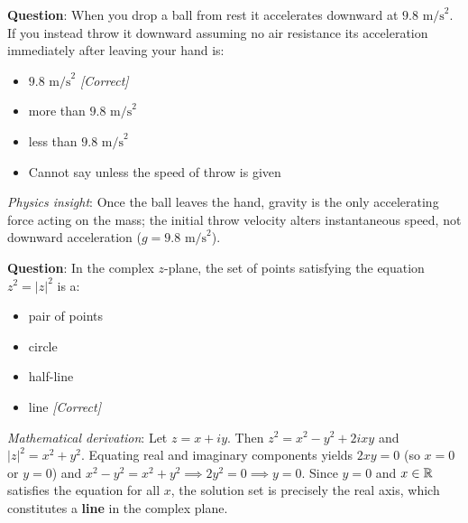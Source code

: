 \documentclass[../../../main.tex]{subfiles}
\begin{document}
\begin{center}
\begin{minipage}{0.95\textwidth}
\begin{tcolorbox}[colback=cardBg,colframe=cardLine,arc=2pt,boxrule=0.5pt,title=\textbf{MMLU Example 1: Conceptual Physics}]
\small\sffamily
\textbf{Question}: When you drop a ball from rest it accelerates downward at $9.8\text{ m/s}^2$. If you instead throw it downward assuming no air resistance its acceleration immediately after leaving your hand is:
\begin{itemize}[leftmargin=1.5em,itemsep=1pt]
    \item[\textbf{(A)}] $9.8\text{ m/s}^2$ \hfill \textit{[Correct]}
    \item[\textbf{(B)}] more than $9.8\text{ m/s}^2$
    \item[\textbf{(C)}] less than $9.8\text{ m/s}^2$
    \item[\textbf{(D)}] Cannot say unless the speed of throw is given
\end{itemize}
\textit{Physics insight}: Once the ball leaves the hand, gravity is the only accelerating force acting on the mass; the initial throw velocity alters instantaneous speed, not downward acceleration ($g = 9.8\text{ m/s}^2$).
\end{tcolorbox}
\end{minipage}
\end{center}

\vspace{0.2cm}

\begin{center}
\begin{minipage}{0.95\textwidth}
\begin{tcolorbox}[colback=cardBg,colframe=cardLine,arc=2pt,boxrule=0.5pt,title=\textbf{MMLU Example 2: College Mathematics}]
\small\sffamily
\textbf{Question}: In the complex $z$-plane, the set of points satisfying the equation $z^2 = |z|^2$ is a:
\begin{itemize}[leftmargin=1.5em,itemsep=1pt]
    \item[\textbf{(A)}] pair of points
    \item[\textbf{(B)}] circle
    \item[\textbf{(C)}] half-line
    \item[\textbf{(D)}] line \hfill \textit{[Correct]}
\end{itemize}
\textit{Mathematical derivation}: Let $z = x + iy$. Then $z^2 = x^2 - y^2 + 2ixy$ and $|z|^2 = x^2 + y^2$. Equating real and imaginary components yields $2xy = 0$ (so $x=0$ or $y=0$) and $x^2 - y^2 = x^2 + y^2 \implies 2y^2 = 0 \implies y = 0$. Since $y=0$ and $x \in \mathbb{R}$ satisfies the equation for all $x$, the solution set is precisely the real axis, which constitutes a \textbf{line} in the complex plane.
\end{tcolorbox}
\end{minipage}
\end{center}
\end{document}

